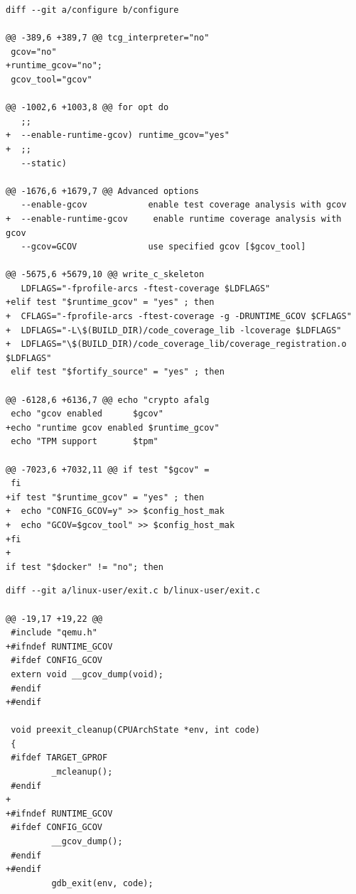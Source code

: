 \documentclass[12pt,oneside]{memoir}
\newcommand{\strano}[1]{\textit{#1}}
\begin{document}
\newpage

\begin{lstlisting}[caption={Izmene skripte \strano{configure}},frame=single, label=qemu-diff-1]
diff --git a/configure b/configure

@@ -389,6 +389,7 @@ tcg_interpreter="no"
 gcov="no"
+runtime_gcov="no";
 gcov_tool="gcov"

@@ -1002,6 +1003,8 @@ for opt do
   ;;
+  --enable-runtime-gcov) runtime_gcov="yes"
+  ;;
   --static)

@@ -1676,6 +1679,7 @@ Advanced options 
   --enable-gcov            enable test coverage analysis with gcov
+  --enable-runtime-gcov     enable runtime coverage analysis with gcov
   --gcov=GCOV              use specified gcov [$gcov_tool]

@@ -5675,6 +5679,10 @@ write_c_skeleton
   LDFLAGS="-fprofile-arcs -ftest-coverage $LDFLAGS"
+elif test "$runtime_gcov" = "yes" ; then
+  CFLAGS="-fprofile-arcs -ftest-coverage -g -DRUNTIME_GCOV $CFLAGS"
+  LDFLAGS="-L\$(BUILD_DIR)/code_coverage_lib -lcoverage $LDFLAGS"
+  LDFLAGS="\$(BUILD_DIR)/code_coverage_lib/coverage_registration.o $LDFLAGS"
 elif test "$fortify_source" = "yes" ; then
 
@@ -6128,6 +6136,7 @@ echo "crypto afalg      
 echo "gcov enabled      $gcov"
+echo "runtime gcov enabled $runtime_gcov"
 echo "TPM support       $tpm"

@@ -7023,6 +7032,11 @@ if test "$gcov" = 
 fi
+if test "$runtime_gcov" = "yes" ; then
+  echo "CONFIG_GCOV=y" >> $config_host_mak
+  echo "GCOV=$gcov_tool" >> $config_host_mak
+fi
+
if test "$docker" != "no"; then
\end{lstlisting}

\newpage
\begin{lstlisting}[caption={Izmene fajla \strano{linux-user/exit.c}},frame=single, label=qemu-diff-2]
diff --git a/linux-user/exit.c b/linux-user/exit.c

@@ -19,17 +19,22 @@
 #include "qemu.h"
+#ifndef RUNTIME_GCOV
 #ifdef CONFIG_GCOV
 extern void __gcov_dump(void);
 #endif
+#endif
 
 void preexit_cleanup(CPUArchState *env, int code)
 {
 #ifdef TARGET_GPROF
         _mcleanup();
 #endif
+
+#ifndef RUNTIME_GCOV
 #ifdef CONFIG_GCOV
         __gcov_dump();
 #endif
+#endif
         gdb_exit(env, code);
\end{lstlisting}
\end{document}
